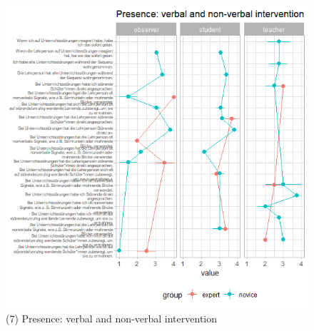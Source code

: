 \documentclass[
  english,
  man,floatsintext]{apa6}
\begin{document}
\begin{figure}

{\centering \includegraphics{./pictures/presenceverbalnonverbalintervention} 

}

\caption{(7) Presence: verbal and non-verbal intervention}\label{fig:presenceverbalnonverbalintervention}
\end{figure}
\newpage
\end{document}
